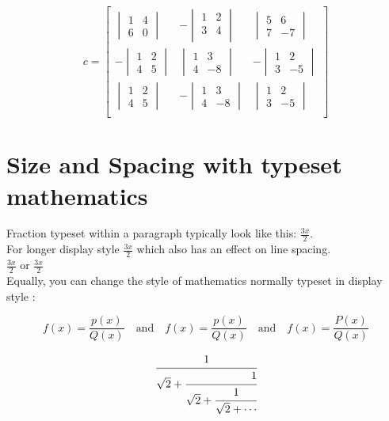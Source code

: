 \documentclass{report}
\begin{document}
\begin{enumerate}
\[
c= \begin{bmatrix}
    \begin{vmatrix}
        1 & 4 \\
        6 & 0
    \end{vmatrix} & - \begin{vmatrix}
        1 & 2 \\
        3 & 4 \\
    \end{vmatrix} & \begin{vmatrix}
        5 & 6 \\
        7 & -7
    \end{vmatrix} \\
    - \begin{vmatrix}
        1 & 2 \\
        4 & 5
    \end{vmatrix} & \begin{vmatrix}
        1 & 3 \\ 
        4 & -8
    \end{vmatrix} & - \begin{vmatrix}
        1 & 2 \\
        3 & -5 
    \end{vmatrix} \\
     \begin{vmatrix}
        1 & 2 \\
        4 & 5
    \end{vmatrix} & - \begin{vmatrix}
        1 & 3 \\ 
        4 & -8
    \end{vmatrix} & \begin{vmatrix}
        1 & 2 \\
        3 & -5 
    \end{vmatrix} \\
\end{bmatrix}
\]
\end{enumerate}

\section{Size and Spacing with typeset mathematics}
Fraction typeset within a paragraph typically look like this: \(\frac{3x}{2}\). \\
For longer display style \(\displaystyle \frac{3x}{2}\) which also has an effect on line spacing. \\
\(\scriptstyle  \frac{3x}{2}\) or \(\scriptscriptstyle \frac{3x}{2}\) \\
 Equally, you can change the style of mathematics normally typeset in display style :

 \[f(x)=\frac{p(x)}{Q(x)}\quad \textrm{and} \quad \textstyle 
 f(x)=\frac{p(x)}{Q(x)}\quad \textrm{and} \quad \scriptstyle f(x)= \frac{P(x)}{Q(x)} 
 \]
   
 \[
  \cfrac[|]{1}{\sqrt{2} +
    \cfrac[r]{1}{\sqrt{2}+
    \cfrac{1}{\sqrt{2}+\dotsb }}}
 \]
\end{document}
